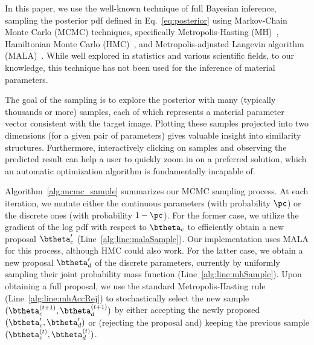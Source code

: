 In this paper, we use the well-known technique of full Bayesian inference, sampling the posterior pdf defined in Eq.~\eqref{eq:posterior} using Markov-Chain Monte Carlo (MCMC) techniques, specifically Metropolis-Hasting (MH)~\cite{Hastings}, Hamiltonian Monte Carlo (HMC)~\cite{Betancourt2017}, and Metropolis-adjusted Langevin algorithm (MALA)~\cite{MALA}. While well explored in statistics and various scientific fields, to our knowledge, this technique has not been used for the inference of material parameters.

The goal of the sampling is to explore the posterior with many (typically thousands or more) samples, each of which represents a material parameter vector consistent with the target image. Plotting these samples projected into two dimensions (for a given pair of parameters) gives valuable insight into similarity structures. Furthermore, interactively clicking on samples and observing the predicted result can help a user to quickly zoom in on a preferred solution, which an automatic optimization algorithm is fundamentally incapable of.

Algorithm~\ref{alg:mcmc_sample} summarizes our MCMC sampling process. At each iteration, we mutate either the continuous parameters (with probability $\pc$) or the discrete ones (with probability $1 - \pc$).
For the former case, we utilize the gradient of the log pdf with respect to $\btheta_c$ to efficiently obtain a new proposal $\btheta_c'$ (Line~\ref{alg:line:malaSample}).
Our implementation uses MALA for this process, although HMC could also work.
For the latter case, we obtain a new proposal $\btheta_d'$ of the discrete parameters, currently by uniformly sampling their joint probability mass function (Line~\ref{alg:line:mhSample}).
Upon obtaining a full proposal, we use the standard Metropolis-Hasting rule (Line~\ref{alg:line:mhAccRej}) to stochastically select the new sample $(\btheta_c^{(t + 1)}, \btheta_d^{(t + 1)})$ by either accepting the newly proposed $(\btheta_c', \btheta_d')$ or (rejecting the proposal and) keeping the previous sample $(\btheta_c^{(t)}, \btheta_d^{(t)})$.
